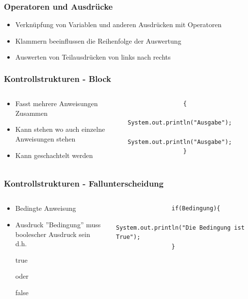 \begin{frame}[fragile]
	\frametitle{Operatoren und Ausdr\"ucke}
	\begin{itemize}
		\item Verkn\"upfung von Variablen und anderen Ausdr\"ucken mit Operatoren
		\item Klammern beeinflussen die Reihenfolge der Auswertung
		\item Auswerten von Teilausdr\"ucken von links nach rechts
	\end{itemize}
\end{frame}

\begin{frame}[fragile]
	\frametitle{Kontrollstrukturen - Block}
	\begin{columns}
		\begin{column}{0.5\textwidth}
			\begin{itemize}
			\item Fasst mehrere Anweisungen Zusammen
			\item Kann stehen wo auch einzelne Anweisungen stehen
			\item Kann geschachtelt werden
		\end{itemize}
		\end{column}
		\begin{column}{0.5\textwidth}
			\begin{lstlisting}
				{
					System.out.println("Ausgabe");
					System.out.println("Ausgabe");
				}
			\end{lstlisting}
		\end{column}
	\end{columns}
\end{frame}

\begin{frame}[fragile]
	\frametitle{Kontrollstrukturen - Fallunterscheidung}
	\begin{columns}
		\begin{column}{0.5\textwidth}
			\begin{itemize}
			  \item Bedingte Anweisung
			  \item Ausdruck ''Bedingung'' muss boolescher Ausdruck sein\\
			  d.h. \begin{itshape}true\end{itshape} oder
			  \begin{itshape}false\end{itshape}
			\end{itemize}
		\end{column}
		\begin{column}{0.5\textwidth}
			\begin{lstlisting}
				if(Bedingung){
					System.out.println("Die Bedingung ist True");
				}
			\end{lstlisting}
		\end{column}
	\end{columns}
\end{frame}

